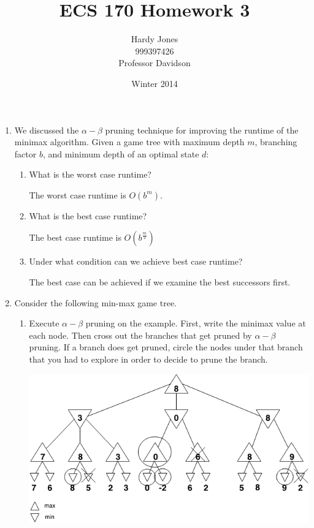\documentclass[12pt,letterpaper]{article}
\title{ECS 170 Homework 3\vspace{-2ex}}
\author{Hardy Jones\\
        999397426\\
        Professor Davidson\vspace{-2ex}}
\date{Winter 2014}
\begin{document}
  \maketitle

  \begin{enumerate}
    \item
      We discussed the $\alpha-\beta$ pruning technique for improving the runtime of the minimax algorithm.
      Given a game tree with maximum depth $m$, branching factor $b$, and minimum depth of an optimal state $d$:

      \begin{enumerate}
        \item What is the worst case runtime?

          The worst case runtime is $O(b^m)$.
        \item What is the best case runtime?

          The best case runtime is $O(b^\frac{m}{2})$
        \item Under what condition can we achieve best case runtime?

          The best case can be achieved if we examine the best successors first.
      \end{enumerate}
    \item
      Consider the following min-max game tree.

      \begin{enumerate}
        \item
          Execute $\alpha-\beta$ pruning on the example.
          First, write the minimax value at each node.
          Then cross out the branches that get pruned by $\alpha-\beta$ pruning.
          If a branch does get pruned, circle the nodes under that branch that you had to explore in order to decide to prune the branch.

          \includegraphics[width=5.5in]{minimax_circled.png}
      \end{enumerate}
  \end{enumerate}
\end{document}

